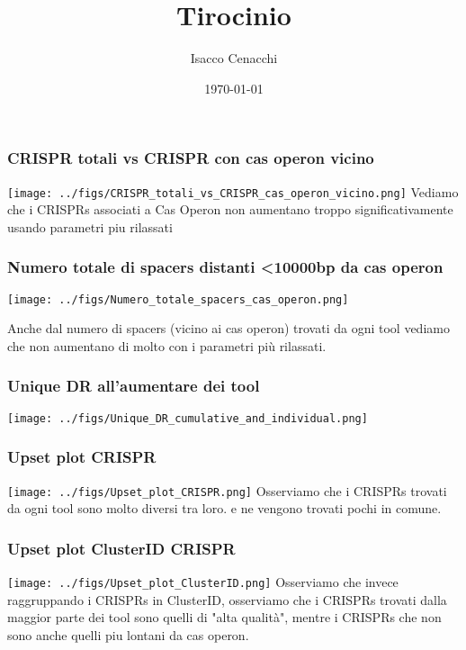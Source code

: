 \documentclass{beamer}
\title{Tirocinio}
\author{Isacco Cenacchi}
\date{\today}
\begin{document}
\frame{\titlepage}

\begin{frame}
    \frametitle{\ttfamily CRISPR totali vs CRISPR con cas operon vicino}
    \centering
    \texttt{[image: ../figs/CRISPR\_totali\_vs\_CRISPR\_cas\_operon\_vicino.png]}
    Vediamo che i CRISPRs associati a Cas Operon non aumentano troppo significativamente usando parametri piu rilassati
\end{frame}


\begin{frame}
    \frametitle{\ttfamily Numero totale di spacers distanti <10000bp da cas operon}
    \begin{minipage}{0.7\textwidth}
        \centering
        \texttt{[image: ../figs/Numero\_totale\_spacers\_cas\_operon.png]}
    \end{minipage}%
    \hfill
    \begin{minipage}{0.25\textwidth}
        Anche dal numero di spacers (vicino ai cas operon) trovati da ogni tool vediamo che non aumentano di molto con i parametri più rilassati.
    \end{minipage}
\end{frame}

\begin{frame}
    \frametitle{\ttfamily Unique DR all'aumentare dei tool}
    \centering
    \texttt{[image: ../figs/Unique\_DR\_cumulative\_and\_individual.png]}
\end{frame}

\begin{frame}
    \frametitle{\ttfamily Upset plot CRISPR}
    \centering
    \texttt{[image: ../figs/Upset\_plot\_CRISPR.png]}
    Osserviamo che i CRISPRs trovati da ogni tool sono molto diversi tra loro. e ne vengono trovati pochi in comune.
\end{frame}

\begin{frame}
    \frametitle{\ttfamily Upset plot ClusterID CRISPR}
    \centering
    \texttt{[image: ../figs/Upset\_plot\_ClusterID.png]}
    Osserviamo che invece raggruppando i CRISPRs in ClusterID, osserviamo che i CRISPRs trovati dalla maggior parte dei tool sono quelli di "alta qualità", mentre i CRISPRs che non sono anche quelli piu lontani da cas operon.
\end{frame}
\end{document}
